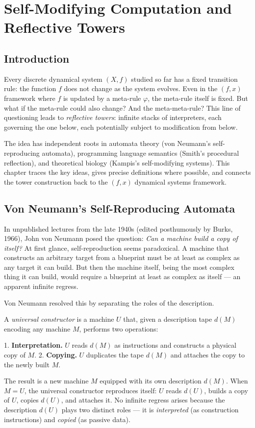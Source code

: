 \chapter{Self-Modifying Computation and Reflective Towers}

\section{Introduction}

Every discrete dynamical system $(X, f)$ studied so far has a fixed transition rule: the function $f$ does not change as the system evolves. Even in the $(f, x)$ framework where $f$ is updated by a meta-rule $\varphi$, the meta-rule itself is fixed. But what if the meta-rule could also change? And the meta-meta-rule? This line of questioning leads to \textit{reflective towers}: infinite stacks of interpreters, each governing the one below, each potentially subject to modification from below.

The idea has independent roots in automata theory (von Neumann's self-reproducing automata), programming language semantics (Smith's procedural reflection), and theoretical biology (Kampis's self-modifying systems). This chapter traces the key ideas, gives precise definitions where possible, and connects the tower construction back to the $(f, x)$ dynamical systems framework.

\section{Von Neumann's Self-Reproducing Automata}

In unpublished lectures from the late 1940s (edited posthumously by Burks, 1966), John von Neumann posed the question: \textit{Can a machine build a copy of itself?} At first glance, self-reproduction seems paradoxical. A machine that constructs an arbitrary target from a blueprint must be at least as complex as any target it can build. But then the machine itself, being the most complex thing it can build, would require a blueprint at least as complex as itself --- an apparent infinite regress.

Von Neumann resolved this by separating the roles of the description.

\begin{definition}
A \textit{universal constructor} is a machine $U$ that, given a description tape $d(M)$ encoding any machine $M$, performs two operations:

1. \textbf{Interpretation.} $U$ reads $d(M)$ as instructions and constructs a physical copy of $M$.
2. \textbf{Copying.} $U$ duplicates the tape $d(M)$ and attaches the copy to the newly built $M$.

The result is a new machine $M$ equipped with its own description $d(M)$. When $M = U$, the universal constructor reproduces itself: $U$ reads $d(U)$, builds a copy of $U$, copies $d(U)$, and attaches it. No infinite regress arises because the description $d(U)$ plays two distinct roles --- it is \textit{interpreted} (as construction instructions) and \textit{copied} (as passive data).
\end{definition}

